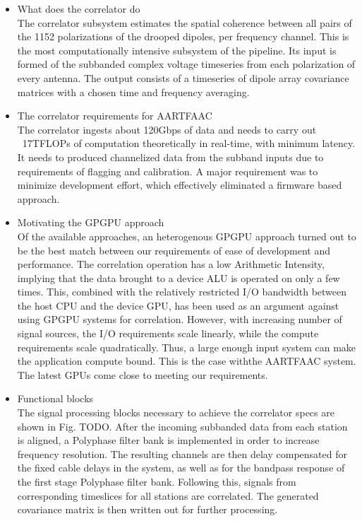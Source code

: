\documentclass{ws-jai}
\begin{document}
\begin {itemize}
\item  What does  the correlator  do\\  
The correlator  subsystem estimates the  spatial coherence between all  pairs of
the 1152 polarizations  of the drooped dipoles, per frequency  channel.  This is
the  most computationally  intensive subsystem  of the  pipeline.  Its  input is
formed of  the subbanded  complex voltage timeseries  from each  polarization of
every antenna.  The  output consists of a timeseries of  dipole array covariance
matrices with a chosen time and frequency averaging.

\item The correlator  requirements for AARTFAAC \\
The correlator ingests about 120Gbps of data and needs to carry out ~17TFLOPs of
computation  theoretically  in real-time,  with  minimum  latency. It  needs  to
produced  channelized  data from  the  subband  inputs  due to  requirements  of
flagging  and calibration.   A  major requirement  was  to minimize  development
effort, which effectively eliminated a firmware based approach.

\item Motivating the GPGPU approach\\
Of the available approaches, an heterogenous GPGPU approach turned out to be the
best match between our requirements of  ease of development and performance. The
correlation operation  has a  low Arithmetic Intensity,  implying that  the data
brought to a device ALU is operated on only a few times. This, combined with the
relatively restricted I/O bandwidth between the host CPU and the device GPU, has
been used as  an argument against using GPGPU systems  for correlation. However,
with increasing number  of signal sources, the I/O  requirements scale linearly,
while the compute  requirements scale quadratically. Thus, a  large enough input
system can make the application compute bound. This is the case withthe AARTFAAC
system. The latest GPUs come close to meeting our requirements.

\item Functional blocks \\
The signal processing blocks necessary to achieve the correlator specs are shown
in Fig. TODO.  After the incoming subbanded data from each station is aligned, a
Polyphase filter bank is implemented  in order to increase frequency resolution.
The resulting channels are then delay  compensated for the fixed cable delays in
the system, as  well as for the  bandpass response of the  first stage Polyphase
filter  bank.  Following  this, signals  from corresponding  timeslices for  all
stations are correlated. The generated covariance matrix is then written out for
further processing.
\end {itemize}
\end{document}
